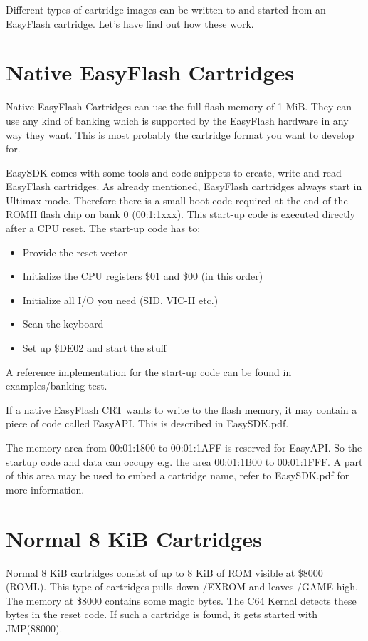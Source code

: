 \documentclass[a4paper,oneside]{memoir}
\begin{document}
Different types of cartridge images can be written to and started from an
EasyFlash cartridge. Let's have find out how these work.

\section{Native EasyFlash Cartridges}\label{native-easyflash-cartridges}

Native EasyFlash Cartridges can use the full flash memory of 1 MiB. They can
use any kind of banking which is supported by the EasyFlash hardware in any way
they want. This is most probably the cartridge format you want to develop for.

EasySDK comes with some tools and code snippets to create, write and read
EasyFlash cartridges.
As already mentioned, EasyFlash cartridges always start in Ultimax mode.
Therefore there is a small boot code required at the end of the ROMH flash chip
on bank 0 (00:1:1xxx). This start-up code is executed directly after a CPU
reset.
The start-up code has to:

\begin{itemize}
  \item Provide the reset vector
  \item Initialize the CPU registers \$01 and \$00 (in this order)
  \item Initialize all I/O you need (SID, VIC-II etc.)
  \item Scan the keyboard
  \item Set up \$DE02 and start the stuff
\end{itemize}

A reference implementation for the start-up code can be found in
examples/banking-test.

If a native EasyFlash CRT wants to write to the flash memory, it may contain a
piece of code called EasyAPI. This is described in EasySDK.pdf.

The memory area from 00:01:1800 to 00:01:1AFF is reserved for EasyAPI. So the
startup code and data can occupy e.g. the area 00:01:1B00 to 00:01:1FFF. A part
of this area may be used to embed a cartridge name, refer to EasySDK.pdf for more information.

\section {Normal 8 KiB Cartridges}

Normal 8 KiB cartridges consist of up to 8 KiB of ROM visible at \$8000 (ROML).
This type of cartridges pulls down /EXROM and leaves /GAME high.
The memory at \$8000 contains some magic bytes. The C64 Kernal detects these
bytes in the reset code. If such a cartridge is found, it gets started with
JMP(\$8000).
\end{document}
